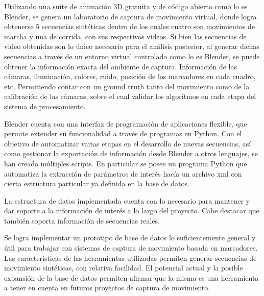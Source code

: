  Utilizando una suite de animación 3D gratuita y de código abierto como lo es Blender, se genera un laboratorio de captura de movimiento virtual, donde logra obtenerse 5 secuencias sintéticas dentro de los cuales cuatro son movimientos de marcha y una de corrida, con sus respectivos videos.  Si bien las secuencias de video obtenidas son lo único necesario para el análisis posterior, al generar dichas secuencias a través de un entorno virtual controlado como lo es Blender, se puede obtener la información exacta del ambiente de captura. Información de las cámaras, iluminación, colores, ruido, posición de los marcadores en cada cuadro, etc. Permitiendo contar con un ground truth tanto del movimiento como de la calibración de las cámaras, sobre el cual validar los algoritmos en cada etapa del sistema de procesamiento. 
 
   
Blender cuenta con una interfaz de programación de aplicaciones flexible, que permite extender su funcionalidad a través de programas en Python. Con el objetivo de automatizar varias etapas en el desarrollo de nuevas secuencias, así como gestionar la exportación de información desde Blender a otros lenguajes, se han creado múltiples scripts. En particular se posee un programa Python que automatiza la extracción de parámetros de interés hacía un archivo xml con cierta estructura particular ya definida en la base de datos. 


La estructura de datos implementada cuenta con lo necesario para mantener y dar soporte a la información de interés a lo largo del proyecto. Cabe destacar que también soporta información de secuencias reales.



Se logra implementar un prototipo de base de datos lo suficientemente general y útil para trabajar con sistemas de captura de movimiento basada en marcadores. Las características de las herramientas utilizadas permiten generar secuencias de movimiento sintéticas, con relativa facilidad. El potencial actual y la posible expansión de la base de datos permiten afirmar que la misma es una herramienta a tener en cuenta en futuros proyectos de captura de movimiento.


